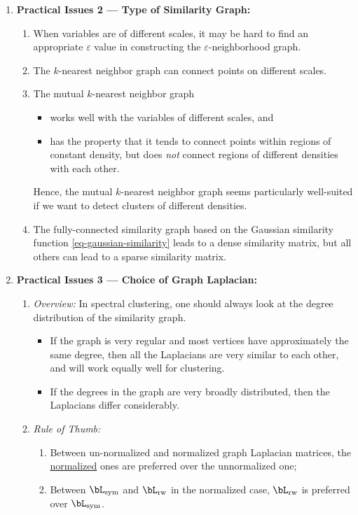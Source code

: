 \documentclass[12pt]{article}
\begin{document}
\begin{enumerate}[label=\textbf{\arabic*.}]
	\item \textbf{Practical Issues 2 --- Type of Similarity Graph:} 
	\begin{enumerate}
		\item When variables are of different scales, it may be hard to find an appropriate $\varepsilon$ value in constructing the $\varepsilon$-neighborhood graph. 
		\item The $k$-nearest neighbor graph can connect points on different scales. 
		\item The mutual $k$-nearest neighbor graph 
		\begin{itemize}
			\item works well with the variables of different scales, and 
			\item has the property that it tends to connect points within regions of constant density, but does \emph{not} connect regions of different densities with each other. 
		\end{itemize}
		Hence, the mutual $k$-nearest neighbor graph seems particularly well-suited if we want to detect clusters of different densities. 
		\item The fully-connected similarity graph based on the Gaussian similarity function \eqref{eq-gaussian-similarity} leads to a dense similarity matrix, but all others can lead to a sparse similarity matrix. 
	\end{enumerate}
	
	\item \textbf{Practical Issues 3 --- Choice of Graph Laplacian:} 
	\begin{enumerate}
		\item \textit{Overview:} In spectral clustering, one should always look at the degree distribution of the similarity graph. 
		\begin{itemize}
			\item If the graph is very regular and most vertices have approximately the same degree, then all the Laplacians are very similar to each other, and will work equally well for clustering. 
			\item If the degrees in the graph are very broadly distributed, then the Laplacians differ considerably. 
		\end{itemize}
		
		\item \textit{Rule of Thumb:} 
		\begin{enumerate}
			\item Between un-normalized and normalized graph Laplacian matrices, the \underline{normalized} ones are preferred over the unnormalized one; 
			\item Between $\bL_{\mathrm{sym}}$ and $\bL_{\mathrm{rw}}$ in the normalized case, $\bL_{\mathrm{rw}}$ is preferred over $\bL_{\mathrm{sym}}$. 
		\end{enumerate}
		

\end{enumerate}
\end{enumerate}
\end{document}
